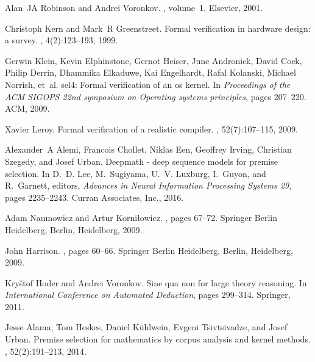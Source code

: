 \documentclass{article}
\begin{document}
\small
\begin{thebibliography}{10}

Alan~JA Robinson and Andrei Voronkov.
, volume~1.
\newblock Elsevier, 2001.

Christoph Kern and Mark~R Greenstreet.
\newblock Formal verification in hardware design: a survey.
, 4(2):123--193, 1999.

Gerwin Klein, Kevin Elphinstone, Gernot Heiser, June Andronick, David Cock,
  Philip Derrin, Dhammika Elkaduwe, Kai Engelhardt, Rafal Kolanski, Michael
  Norrish, et~al.
\newblock sel4: Formal verification of an os kernel.
\newblock In {\em Proceedings of the ACM SIGOPS 22nd symposium on Operating
  systems principles}, pages 207--220. ACM, 2009.

Xavier Leroy.
\newblock Formal verification of a realistic compiler.
, 52(7):107--115, 2009.

Alexander~A Alemi, Francois Chollet, Niklas Een, Geoffrey Irving, Christian
  Szegedy, and Josef Urban.
\newblock Deepmath - deep sequence models for premise selection.
\newblock In D.~D. Lee, M.~Sugiyama, U.~V. Luxburg, I.~Guyon, and R.~Garnett,
  editors, {\em Advances in Neural Information Processing Systems 29}, pages
  2235--2243. Curran Associates, Inc., 2016.

Adam Naumowicz and Artur Korni{\l}owicz.
, pages 67--72.
\newblock Springer Berlin Heidelberg, Berlin, Heidelberg, 2009.

John Harrison.
, pages 60--66.
\newblock Springer Berlin Heidelberg, Berlin, Heidelberg, 2009.

Kry{\v{s}}tof Hoder and Andrei Voronkov.
\newblock Sine qua non for large theory reasoning.
\newblock In {\em International Conference on Automated Deduction}, pages
  299--314. Springer, 2011.

Jesse Alama, Tom Heskes, Daniel K{\"u}hlwein, Evgeni Tsivtsivadze, and Josef
  Urban.
\newblock Premise selection for mathematics by corpus analysis and kernel
  methods.
, 52(2):191--213, 2014.


\end{thebibliography}
\end{document}

